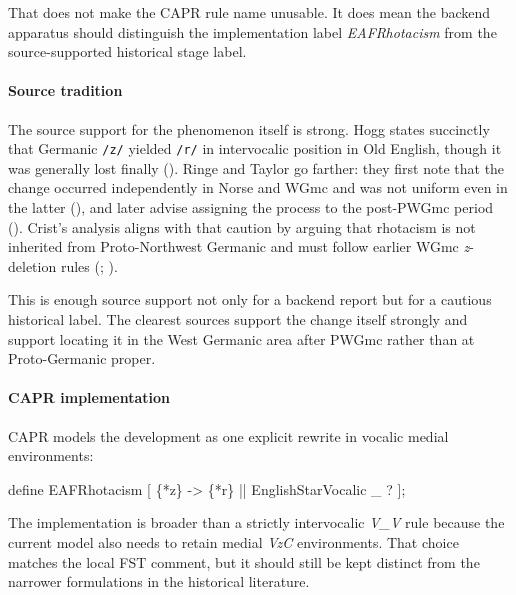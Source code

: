 \documentclass[
  british,
  a4paper,
]{article}
\newenvironment{Shaded}{}{}
\newcommand{\NormalTok}[1]{#1}
\begin{document}
That does not make the CAPR rule name unusable. It does mean the backend
apparatus should distinguish the implementation label
\emph{EAFRhotacism} from the source-supported historical stage label.

\paragraph{Source tradition}\label{source-tradition}

The source support for the phenomenon itself is strong. Hogg states
succinctly that Germanic \texttt{/z/} yielded \texttt{/r/} in
intervocalic position in Old English, though it was generally lost
finally (). Ringe and Taylor go
farther: they first note that the change occurred independently in Norse
and WGmc and was not uniform even in the latter
(), and later
advise assigning the process to the post-PWGmc period
().
Crist's analysis aligns with that caution by arguing that rhotacism is
not inherited from Proto-Northwest Germanic and must follow earlier WGmc
\emph{z}-deletion rules (;
).

This is enough source support not only for a backend report but for a
cautious historical label. The clearest sources support the change
itself strongly and support locating it in the West Germanic area after
PWGmc rather than at Proto-Germanic proper.

\paragraph{CAPR implementation}\label{capr-implementation}

CAPR models the development as one explicit rewrite in vocalic medial
environments:

\begin{Shaded}
\begin{Highlighting}[]
\NormalTok{define EAFRhotacism [}
\NormalTok{    \{*z\} {-}\textgreater{} \{*r\} || EnglishStarVocalic \_ ?}
\NormalTok{];}
\end{Highlighting}
\end{Shaded}

The implementation is broader than a strictly intervocalic \emph{V\_V}
rule because the current model also needs to retain medial \emph{VzC}
environments. That choice matches the local FST comment, but it should
still be kept distinct from the narrower formulations in the historical
literature.
\end{document}
